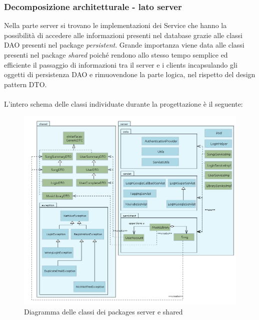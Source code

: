 \subsubsection{Decomposizione architetturale - lato server}
Nella parte server si trovano le implementazioni dei Service che hanno
la possibilit\`a di accedere alle informazioni presenti nel database grazie alle
classi DAO presenti nel package \emph{persistent}.
Grande importanza viene data alle classi presenti nel package \emph{shared}
poich\'e rendono allo stesso tempo semplice ed efficiente il passaggio di
informazioni tra il server e i clients incapsulando gli oggetti di
persistenza DAO e rimuovendone la parte logica, nel rispetto del design pattern
DTO. \\\\ L'intero schema delle classi
individuate durante la progettazione \`e il seguente: 
\begin{figure}[h]
  \centering
  \includegraphics[width=16.5cm]{img/ST/Server&Shared.png}
\caption{Diagramma delle classi dei packages server e shared}
\end{figure}

